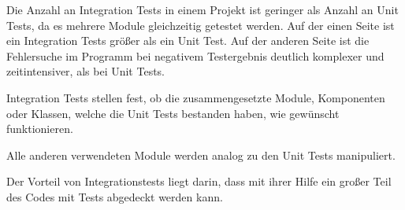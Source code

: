 Die Anzahl an Integration Tests in einem Projekt ist geringer als Anzahl an Unit Tests, da es mehrere Module gleichzeitig getestet werden.
Auf der einen Seite ist ein Integration Tests größer als ein Unit Test. 
Auf der anderen Seite ist die Fehlersuche im Programm bei negativem Testergebnis deutlich komplexer und zeitintensiver, 
als bei Unit Tests.

Integration Tests stellen fest, ob die zusammengesetzte Module, Komponenten oder Klassen, welche die Unit Tests bestanden haben, wie gewünscht funktionieren.

Alle anderen verwendeten Module werden analog zu den Unit Tests manipuliert.

Der Vorteil von Integrationstests liegt darin, dass mit ihrer Hilfe ein großer Teil des Codes mit Tests abgedeckt werden kann.